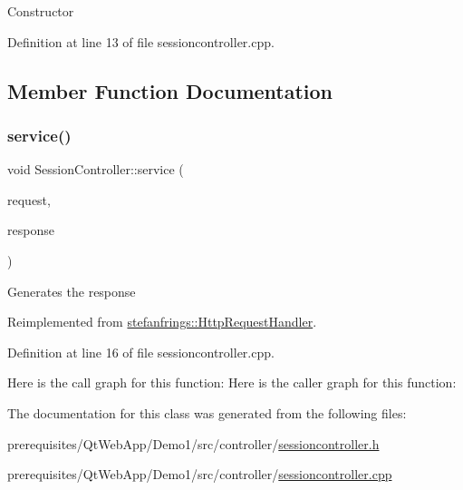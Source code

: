 Constructor 

Definition at line 13 of file sessioncontroller.\+cpp.



\subsection{Member Function Documentation}
\mbox{\label{class_session_controller_a2eb65af29d53ff51d709cc892611d5a9}} 
\subsubsection{\texorpdfstring{service()}{service()}}
{\footnotesize\ttfamily void Session\+Controller\+::service (\begin{DoxyParamCaption}\item[{\mbox{\hyperlink{classstefanfrings_1_1_http_request}{Http\+Request}} \&}]{request,  }\item[{\mbox{\hyperlink{classstefanfrings_1_1_http_response}{Http\+Response}} \&}]{response }\end{DoxyParamCaption})\hspace{0.3cm}{\ttfamily [virtual]}}

Generates the response 

Reimplemented from \mbox{\hyperlink{classstefanfrings_1_1_http_request_handler_a0a7210907152c46b8b5a47feb64cf6bd}{stefanfrings\+::\+Http\+Request\+Handler}}.



Definition at line 16 of file sessioncontroller.\+cpp.

Here is the call graph for this function\+:
Here is the caller graph for this function\+:


The documentation for this class was generated from the following files\+:\begin{DoxyCompactItemize}
\item 
prerequisites/\+Qt\+Web\+App/\+Demo1/src/controller/\mbox{\hyperlink{sessioncontroller_8h}{sessioncontroller.\+h}}\item 
prerequisites/\+Qt\+Web\+App/\+Demo1/src/controller/\mbox{\hyperlink{sessioncontroller_8cpp}{sessioncontroller.\+cpp}}\end{DoxyCompactItemize}

